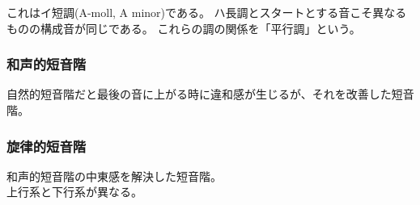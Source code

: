 \documentclass{ltjsarticle}
\begin{document}
{%
\parindent 0pt
\noindent
\ifx\preLilyPondExample \undefined
\else
  \expandafter\preLilyPondExample
\fi
\def\lilypondbook{}%
%
\ifx\postLilyPondExample \undefined
\else
  \expandafter\postLilyPondExample
\fi
}

これはイ短調(A-moll, A minor)である。  
ハ長調とスタートとする音こそ異なるものの構成音が同じである。  
これらの調の関係を「平行調」という。  

\subsubsection{和声的短音階}

自然的短音階だと最後の音に上がる時に違和感が生じるが、それを改善した短音階。

{%
\parindent 0pt
\noindent
\ifx\preLilyPondExample \undefined
\else
  \expandafter\preLilyPondExample
\fi
\def\lilypondbook{}%
%
\ifx\postLilyPondExample \undefined
\else
  \expandafter\postLilyPondExample
\fi
}

\subsubsection{旋律的短音階}
和声的短音階の中東感を解決した短音階。\\
上行系と下行系が異なる。

{%
\parindent 0pt
\noindent
\ifx\preLilyPondExample \undefined
\else
  \expandafter\preLilyPondExample
\fi
\def\lilypondbook{}%
%
\ifx\postLilyPondExample \undefined
\else
  \expandafter\postLilyPondExample
\fi
}
\end{document}
